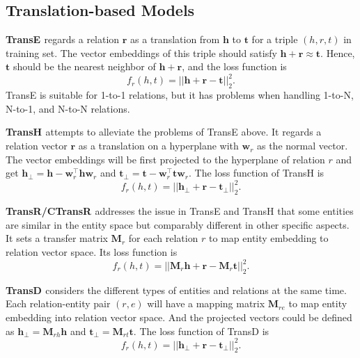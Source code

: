 \documentclass[11pt,a4paper]{article}
\begin{document}
  \subsection{Translation-based Models}
  
  \textbf{TransE \cite{TransE}} regards a relation $\mathbf{r}$ as a translation from $\mathbf{h}$ to $\mathbf{t}$ for a triple
  $(h, r, t)$ in training set. The vector embeddings of this triple should satisfy $\mathbf{h} + \mathbf{r} \approx \mathbf{t}$.
  Hence, $\mathbf{t}$ should be the nearest neighbor of $\mathbf{h} + \mathbf{r}$, and the loss function is 
  \begin{equation}
    f_r(h, t) = ||\mathbf{h} + \mathbf{r} - \mathbf{t}||_2^2.
  \end{equation}
  TransE is suitable for 1-to-1 relations, but it has problems when handling 1-to-N, N-to-1, and N-to-N relations.
  
  \noindent\textbf{TransH \cite{TransH}} attempts to alleviate the problems of TransE above. It regards a relation vector $\mathbf{r}$ 
  as a translation on a hyperplane with $\mathbf{w}_r$ as the normal vector. The vector embeddings will be first projected to the 
  hyperplane of relation $r$ and get $\mathbf{h}_{\perp} = \mathbf{h} - \mathbf{w}_r^{\top}\mathbf{h}\mathbf{w}_r$
  and $\mathbf{t}_{\perp} = \mathbf{t} - \mathbf{w}_r^{\top}\mathbf{t}\mathbf{w}_r$.
  The loss function of TransH is
  \begin{equation}
    f_r(h, t) = ||\mathbf{h}_{\perp} + \mathbf{r} - \mathbf{t}_{\perp}||_2^2.
  \end{equation} 
  
  \noindent\textbf{TransR/CTransR \cite{TransR}} addresses the issue in TransE and TransH that some entities are similar in the entity space but comparably 
  different in other specific aspects. 
  It sets a transfer matrix $\mathbf{M}_r$ for each relation $r$ to map entity embedding to relation vector space. 
  Its loss function is
  \begin{equation}
    f_r(h, t) = ||\mathbf{M}_r\mathbf{h} + \mathbf{r} - \mathbf{M}_r\mathbf{t}||_2^2.
  \end{equation} 
  
  \noindent\textbf{TransD \cite{TransD}} considers the different types of entities and relations at the same time. Each 
  relation-entity pair $(r, e)$ will have a mapping matrix $\mathbf{M}_{re}$ to map entity embedding into relation vector space.
  And the projected vectors could be defined as  $\mathbf{h}_\perp = \mathbf{M}_{rh}\mathbf{h}$ and $\mathbf{t}_\perp = \mathbf{M}_{rt}\mathbf{t}$. The loss
  function of TransD is
  \begin{equation}
    f_r(h, t) = ||\mathbf{h}_{\perp} + \mathbf{r} - \mathbf{t}_{\perp}||_2^2.
  \end{equation}
  
\end{document}
